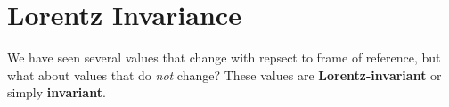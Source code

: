 \section{Lorentz Invariance}

We have seen several values that change with repsect to frame of reference,
but what about values that do \emph{not} change?
These values are \textbf{Lorentz-invariant} or simply \textbf{invariant}.
